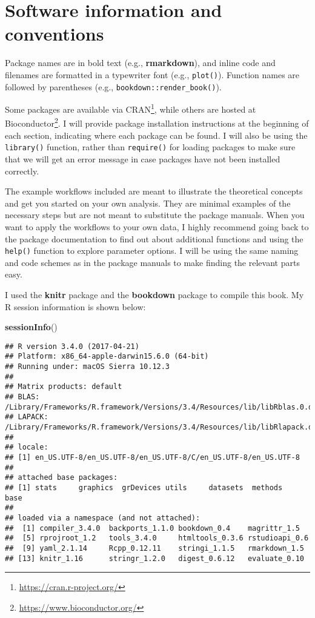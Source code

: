 \documentclass[12pt,]{krantz}
\newenvironment{Shaded}{\begin{snugshade}}{\end{snugshade}}
\newcommand{\KeywordTok}[1]{\textcolor[rgb]{0.27,0.27,0.27}{\textbf{{#1}}}}
\newcommand{\NormalTok}[1]{{#1}}
\renewcommand{\href}[2]{#2\footnote{\url{#1}}}
\theoremstyle{definition}
\theoremstyle{definition}
\theoremstyle{remark}
\begin{document}
\section*{Software information and
conventions}\label{software-information-and-conventions}


Package names are in bold text (e.g., \textbf{rmarkdown}), and inline
code and filenames are formatted in a typewriter font (e.g.,
\texttt{plot()}). Function names are followed by parentheses (e.g.,
\texttt{bookdown::render\_book()}).

Some packages are available via
\href{https://cran.r-project.org/}{CRAN}, while others are
hosted at
\href{https://www.bioconductor.org/}{Bioconductor}.
I will provide package installation instructions at the beginning of
each section, indicating where each package can be found. I will also be
using the \texttt{library()} function, rather than \texttt{require()}
for loading packages to make sure that we will get an error message in
case packages have not been installed correctly.

The example workflows included are meant to illustrate the theoretical
concepts and get you started on your own analysis. They are minimal
examples of the necessary steps but are not meant to substitute the
package manuals. When you want to apply the workflows to your own data,
I highly recommend going back to the package documentation to find out
about additional functions and using the \texttt{help()} function to
explore parameter options. I will be using the same naming and code
schemes as in the package manuals to make finding the relevant parts
easy.

I used the \textbf{knitr} package and the
\textbf{bookdown} package to compile this book. My R
session information is shown below:

\begin{Shaded}
\begin{Highlighting}[]
\KeywordTok{sessionInfo}\NormalTok{()}
\end{Highlighting}
\end{Shaded}

\begin{verbatim}
## R version 3.4.0 (2017-04-21)
## Platform: x86_64-apple-darwin15.6.0 (64-bit)
## Running under: macOS Sierra 10.12.3
## 
## Matrix products: default
## BLAS: /Library/Frameworks/R.framework/Versions/3.4/Resources/lib/libRblas.0.dylib
## LAPACK: /Library/Frameworks/R.framework/Versions/3.4/Resources/lib/libRlapack.dylib
## 
## locale:
## [1] en_US.UTF-8/en_US.UTF-8/en_US.UTF-8/C/en_US.UTF-8/en_US.UTF-8
## 
## attached base packages:
## [1] stats     graphics  grDevices utils     datasets  methods   base     
## 
## loaded via a namespace (and not attached):
##  [1] compiler_3.4.0  backports_1.1.0 bookdown_0.4    magrittr_1.5   
##  [5] rprojroot_1.2   tools_3.4.0     htmltools_0.3.6 rstudioapi_0.6 
##  [9] yaml_2.1.14     Rcpp_0.12.11    stringi_1.1.5   rmarkdown_1.5  
## [13] knitr_1.16      stringr_1.2.0   digest_0.6.12   evaluate_0.10
\end{verbatim}
\end{document}
